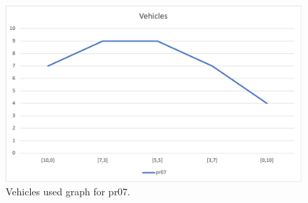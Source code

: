 \begin{figure}[H]
    \centering
    \includegraphics[width=1.0\columnwidth]{../graphs/pr07-vehicles.png}
    \caption{Vehicles used graph for pr07.}
\end{figure}
